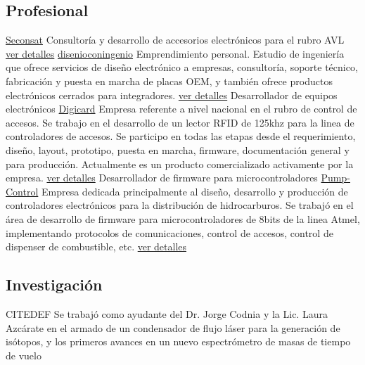 \documentclass[11pt,a4paper,sans]{moderncv} 	%
\begin{document}
	\subsection{Profesional}
	 	{\href{www.seconsat.com} 		{Seconsat}} 		{}{}{Consultoría y desarrollo de accesorios electrónicos para el rubro AVL \href{http://disenioconingenio.com.ar/producto.php?products_id=392}{ver detalles}}
	 			{\href{www.disenioconingenio.com.ar} 	{disenioconingenio}} 	{}{}{Emprendimiento personal. Estudio de ingeniería que ofrece servicios de diseño electrónico a empresas, consultoría, soporte técnico, fabricación y puesta en marcha de placas OEM, y también ofrece productos electrónicos cerrados para integradores. \href{http://disenioconingenio.com.ar}{ver detalles}}
	 	{Desarrollador de equipos electrónicos} 		{\href{www.digicard.com.ar} 		{Digicard}} 		{}{}{Empresa referente a nivel nacional en el rubro de control de accesos. Se trabajo en el desarrollo de un lector RFID de 125khz para la linea de controladores de accesos. Se participo en todas las etapas desde el requerimiento, diseño, layout, prototipo, puesta en marcha, firmware, documentación general y para producción. Actualmente es un producto comercializado activamente por la empresa. \href{http://disenioconingenio.com.ar/producto.php?products_id=393}{ver detalles}}
	 	{Desarrollador de firmware para microcontroladores} 	{\href{www.pump-control.com.ar} 	{Pump-Control}} 	{}{}{Empresa dedicada principalmente al diseño, desarrollo y producción de controladores electrónicos para la distribución de hidrocarburos. Se trabajó en el área de desarrollo de firmware para microcontroladores de 8bits de la linea Atmel, implementando protocolos de comunicaciones, control de accesos, control de dispenser de combustible, etc. \href{http://disenioconingenio.com.ar/producto.php?products_id=391}{ver detalles}}

	\subsection{Investigación}
	 	{CITEDEF} 	{}{}{Se trabajó como ayudante del Dr. Jorge Codnia y la Lic. Laura Azcárate en el armado de un condensador de flujo láser para la generación de isótopos, y los primeros avances en un nuevo espectrómetro de masas de tiempo de vuelo}
\end{document}
